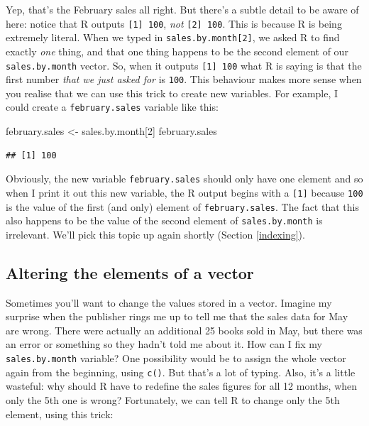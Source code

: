 \documentclass[
]{book}
\newenvironment{Shaded}{\begin{snugshade}}{\end{snugshade}}
\newcommand{\DecValTok}[1]{\textcolor[rgb]{0.00,0.00,0.81}{#1}}
\newcommand{\NormalTok}[1]{#1}
\newcommand{\OtherTok}[1]{\textcolor[rgb]{0.56,0.35,0.01}{#1}}
\begin{document}
Yep, that's the February sales all right. But there's a subtle detail to be aware of here: notice that R outputs \texttt{{[}1{]}\ 100}, \emph{not} \texttt{{[}2{]}\ 100}. This is because R is being extremely literal. When we typed in \texttt{sales.by.month{[}2{]}}, we asked R to find exactly \emph{one} thing, and that one thing happens to be the second element of our \texttt{sales.by.month} vector. So, when it outputs \texttt{{[}1{]}\ 100} what R is saying is that the first number \emph{that we just asked for} is \texttt{100}. This behaviour makes more sense when you realise that we can use this trick to create new variables. For example, I could create a \texttt{february.sales} variable like this:

\begin{Shaded}
\begin{Highlighting}[]
\NormalTok{february.sales }\OtherTok{\textless{}{-}}\NormalTok{ sales.by.month[}\DecValTok{2}\NormalTok{]}
\NormalTok{february.sales}
\end{Highlighting}
\end{Shaded}

\begin{verbatim}
## [1] 100
\end{verbatim}

Obviously, the new variable \texttt{february.sales} should only have one element and so when I print it out this new variable, the R output begins with a \texttt{{[}1{]}} because \texttt{100} is the value of the first (and only) element of \texttt{february.sales}. The fact that this also happens to be the value of the second element of \texttt{sales.by.month} is irrelevant. We'll pick this topic up again shortly (Section \ref{indexing}).

\hypertarget{altering-the-elements-of-a-vector}{%
\subsection{Altering the elements of a vector}\label{altering-the-elements-of-a-vector}}

Sometimes you'll want to change the values stored in a vector. Imagine my surprise when the publisher rings me up to tell me that the sales data for May are wrong. There were actually an additional 25 books sold in May, but there was an error or something so they hadn't told me about it. How can I fix my \texttt{sales.by.month} variable? One possibility would be to assign the whole vector again from the beginning, using \texttt{c()}. But that's a lot of typing. Also, it's a little wasteful: why should R have to redefine the sales figures for all 12 months, when only the 5th one is wrong? Fortunately, we can tell R to change only the 5th element, using this trick:
\end{document}
